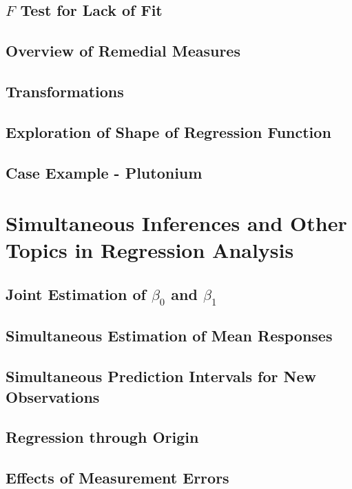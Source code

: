 \subsection{$F$ Test for Lack of Fit}

\subsection{Overview of Remedial Measures}

\subsection{Transformations}

\subsection{Exploration of Shape of Regression Function}

\subsection{Case Example - Plutonium}


\section{Simultaneous Inferences and Other Topics in Regression Analysis}
\subsection{Joint Estimation of $\beta_0$ and $\beta_1$}

\subsection{Simultaneous Estimation of Mean Responses}

\subsection{Simultaneous Prediction Intervals for New Observations}

\subsection{Regression through Origin}

\subsection{Effects of Measurement Errors}

